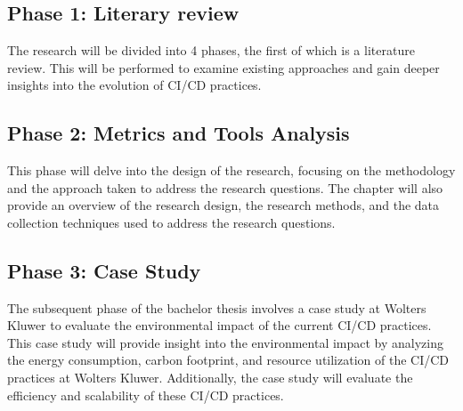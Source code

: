 
\chapter{}%
\label{ch:methodologie}


\section{Phase 1: Literary review}
The research will be divided into 4 phases, the first of which is a literature review. This will be performed to examine existing approaches and gain deeper insights into the evolution of CI/CD practices.

\section{Phase 2: Metrics and Tools Analysis}
This phase will delve into the design of the research, focusing on the methodology and the approach taken to address the research questions. The chapter will also provide an overview of the research design, the research methods, and the data collection techniques used to address the research questions.

\section{Phase 3: Case Study}
The subsequent phase of the bachelor thesis involves a case study at Wolters Kluwer to evaluate the environmental impact of the current CI/CD practices. This case study will provide insight into the environmental impact by analyzing the energy consumption, carbon footprint, and resource utilization of the CI/CD practices at Wolters Kluwer. Additionally, the case study will evaluate the efficiency and scalability of these CI/CD practices.

